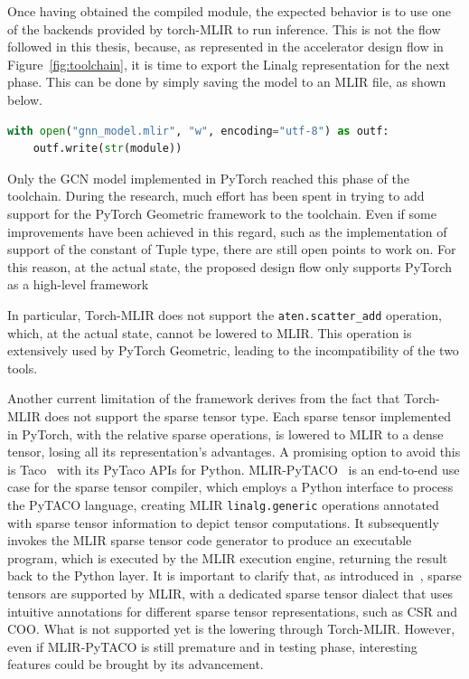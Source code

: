Once having obtained the compiled module, the expected behavior is to use one of the backends provided by torch-MLIR to run inference.
This is not the flow followed in this thesis, because, as represented in the accelerator design flow in Figure~\ref{fig:toolchain}, it is time to export the Linalg representation for the next phase.
This can be done by simply saving the model to an MLIR file, as shown below.
\begin{lstlisting}[language=Python,label={lst:torch_mlir-export}]
with open("gnn_model.mlir", "w", encoding="utf-8") as outf:
    outf.write(str(module))
\end{lstlisting}

Only the GCN model implemented in PyTorch reached this phase of the toolchain.
During the research, much effort has been spent in trying to add support for the PyTorch Geometric framework to the toolchain.
Even if some improvements have been achieved in this regard, such as the implementation of support of the constant of Tuple type, there are still open points to work on.
For this reason, at the actual state, the proposed design flow only supports PyTorch as a high-level framework

In particular, Torch-MLIR does not support the \lstinline{aten.scatter_add} operation, which, at the actual state, cannot be lowered to MLIR\@.
This operation is extensively used by PyTorch Geometric, leading to the incompatibility of the two tools.

Another current limitation of the framework derives from the fact that Torch-MLIR does not support the sparse tensor type.
Each sparse tensor implemented in PyTorch, with the relative sparse operations, is lowered to MLIR to a dense tensor, losing all its representation's advantages.
A promising option to avoid this is Taco~\cite{taco} with its PyTaco APIs for Python.
MLIR-PyTACO~\cite{mlir-pytaco} is an end-to-end use case for the sparse tensor compiler, which employs a Python interface to process the PyTACO language, creating MLIR \lstinline{linalg.generic} operations annotated with sparse tensor information to depict tensor computations.
It subsequently invokes the MLIR sparse tensor code generator to produce an executable program, which is executed by the MLIR execution engine, returning the result back to the Python layer.
It is important to clarify that, as introduced in~\cite{Bik_2022}, sparse tensors are supported by MLIR, with a dedicated sparse tensor dialect that uses intuitive annotations for different sparse tensor representations, such as CSR and COO.
What is not supported yet is the lowering through Torch-MLIR\@.
However, even if MLIR-PyTACO is still premature and in testing phase, interesting features could be brought by its advancement.

